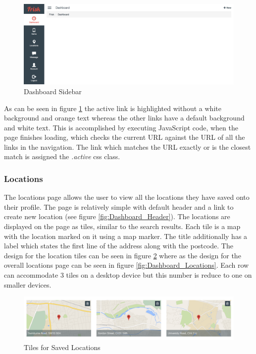 \begin{figure}[H]
	\centering
	\includegraphics[width=1.0\textwidth]{images/Frisk/Dashboard_Sidebar}
	\caption{Dashboard Sidebar} \label{fig:Dashboard_Sidebar}
\end{figure}

As can be seen in figure \ref{fig:Dashboard_Sidebar} the active link is highlighted without a white background and orange text whereas the other links have a default background and white text. This is accomplished by executing JavaScript  code, when the page finishes loading, which checks the current URL against the URL of all the links in the navigation. The link which matches the URL exactly or is the closest match is assigned the \emph{.active} css class.

\subsubsection{Locations}
The locations page allows the user to view all the locations they have saved onto their profile. The page is relatively simple with default header and a link to create new location (see figure \ref{fig:Dashboard_Header}). The locations are displayed on the page as tiles, similar to the search results. Each tile is a map with the location marked on it using a map marker. The title additionally has a label which states the first line of the address along with the postcode. The design for the location tiles can be seen in figure \ref{fig:Location_Tiles} where as the design for the overall locations page can be seen in figure \ref{fig:Dashboard_Locations}. Each row can accommodate 3 tiles on a desktop device but this number is reduce to one on smaller devices.

\begin{figure}[H]
	\centering
	\includegraphics[width=1.0\textwidth]{images/Frisk/Location_Tiles}
	\caption{Tiles for Saved Locations} \label{fig:Location_Tiles}
\end{figure}

